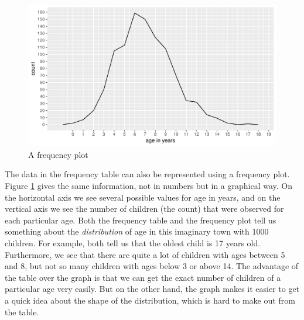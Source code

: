 \documentclass[]{book}\usepackage[]{graphicx}\usepackage[]{color}
\makeatletter
\def\maxwidth{ %
  \ifdim\Gin@nat@width>\linewidth
    \linewidth
  \else
    \Gin@nat@width
  \fi
}
\newenvironment{knitrout}{}{} %
\makeatother
\begin{document}
\begin{knitrout}
\color{fgcolor}\begin{figure}

{\centering \includegraphics[width=\maxwidth]{figure/distr_1-1} 

}

\caption[A frequency plot]{A frequency plot}\label{fig:distr_1}
\end{figure}


\end{knitrout}

The data in the frequency table can also be represented using a frequency plot. Figure \ref{fig:distr_1} gives the same information, not in numbers but in a graphical way. On the horizontal axis we see several possible values for age in years, and on the vertical axis we see the number of children (the count) that were observed for each particular age. Both the frequency table and the frequency plot tell us something about the \textit{distribution} of age in this imaginary town with 1000 children. For example, both tell us that the oldest child is 17 years old. Furthermore, we see that there are quite a lot of children with ages between 5 and 8, but not so many children with ages below 3 or above 14. The advantage of the table over the graph is that we can get the exact number of children of a particular age very easily. But on the other hand, the graph makes it easier to get a quick idea about the shape of the distribution, which is hard to make out from the table.

\end{document}

